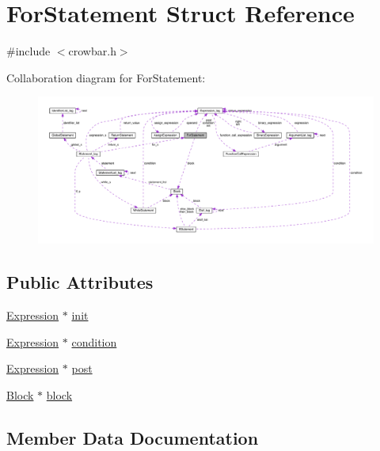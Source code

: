 \hypertarget{struct_for_statement}{}\section{For\+Statement Struct Reference}
\label{struct_for_statement}


{\ttfamily \#include $<$crowbar.\+h$>$}



Collaboration diagram for For\+Statement\+:\nopagebreak
\begin{figure}[H]
\begin{center}
\leavevmode
\includegraphics[width=350pt]{struct_for_statement__coll__graph}
\end{center}
\end{figure}
\subsection*{Public Attributes}
\begin{DoxyCompactItemize}
\item 
\hyperlink{crowbar_8h_a070c6feb370aad8a9665ca315bf6ed4a}{Expression} $\ast$ \hyperlink{struct_for_statement_ad651b9f23924d2f0aa19d4269353b526}{init}
\item 
\hyperlink{crowbar_8h_a070c6feb370aad8a9665ca315bf6ed4a}{Expression} $\ast$ \hyperlink{struct_for_statement_ada11b70a235641ef62d953293d00d7ba}{condition}
\item 
\hyperlink{crowbar_8h_a070c6feb370aad8a9665ca315bf6ed4a}{Expression} $\ast$ \hyperlink{struct_for_statement_a17a10be0a7696c064a0aa7e55e680903}{post}
\item 
\hyperlink{struct_block}{Block} $\ast$ \hyperlink{struct_for_statement_a482b9507e4e7064b2a3449106528d422}{block}
\end{DoxyCompactItemize}


\subsection{Member Data Documentation}
\hypertarget{struct_for_statement_a482b9507e4e7064b2a3449106528d422}{}

